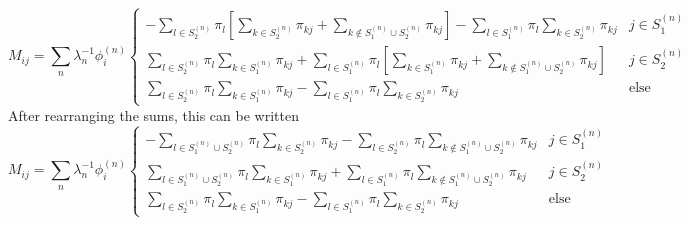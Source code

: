 \documentclass[a4paper]{article}
\newcommand{\evec}[2]{\phi^{(#2)}_{#1}}
\begin{document}
\begin{equation}
M_{ij} = \sum_n \lambda_n^{-1} \evec{i}{n} 
\begin{cases}
-\sum_{l \in S_2^{(n)}} \pi_l
  \left[
  \sum_{k \in S_2^{(n)}} 
  \pi_{kj}
  +
  \sum_{k \notin S_1^{(n)} \cup S_2^{(n)}} 
  \pi_{kj}
  \right]
  - \sum_{l \in S_1^{(n)}} \pi_l \sum_{k \in S_2^{(n)}}  \pi_{kj}
 & j \in S_1^{(n)} \\
\sum_{l \in S_2^{(n)}} \pi_l \sum_{k \in S_1^{(n)}}  \pi_{kj}
+  \sum_{l \in S_1^{(n)}} \pi_l 
\left[
  \sum_{k \in S_1^{(n)}} 
  \pi_{kj}
  +
  \sum_{k \notin S_1^{(n)} \cup S_2^{(n)}} 
  \pi_{kj}
  \right]
& j \in S_2^{(n)} \\
\sum_{l \in S_2^{(n)}} \pi_l \sum_{k \in S_1^{(n)}}  \pi_{kj}
- 
\sum_{l \in S_1^{(n)}} \pi_l \sum_{k \in S_2^{(n)}}  \pi_{kj}
& \text{else}
\end{cases}
\end{equation}
After rearranging the sums, this can be written
\begin{equation}
M_{ij} = \sum_n \lambda_n^{-1} \evec{i}{n} 
\begin{cases}
-\sum_{l \in S_1^{(n)} \cup S_2^{(n)}} \pi_l
\sum_{k \in S_2^{(n)}}  \pi_{kj}
-\sum_{l \in S_2^{(n)}} \pi_l
\sum_{k \notin S_1^{(n)} \cup S_2^{(n)}} \pi_{kj}
 & j \in S_1^{(n)} \\
\sum_{l \in S_1^{(n)} \cup S_2^{(n)}} \pi_l
\sum_{k \in S_1^{(n)}}  \pi_{kj}
+ \sum_{l \in S_1^{(n)}} \pi_l
\sum_{k \notin S_1^{(n)} \cup S_2^{(n)}} \pi_{kj}
& j \in S_2^{(n)} \\
\sum_{l \in S_2^{(n)}} \pi_l \sum_{k \in S_1^{(n)}}  \pi_{kj}
- 
\sum_{l \in S_1^{(n)}} \pi_l \sum_{k \in S_2^{(n)}}  \pi_{kj}
& \text{else}
\end{cases}
\end{equation}
\end{document}
